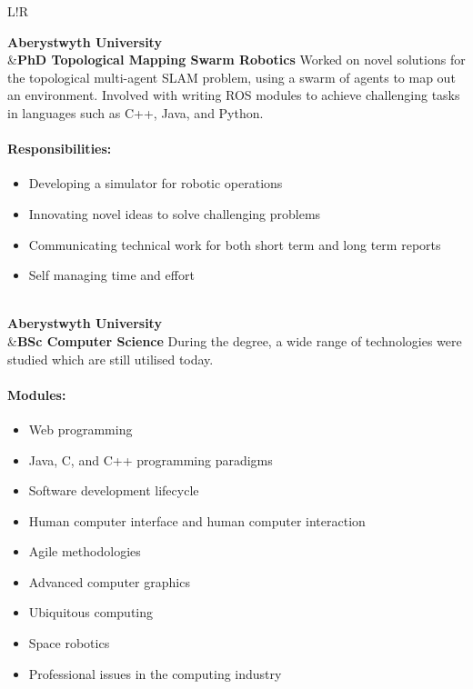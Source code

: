 \documentclass[10pt]{article}
\newcommand\VRule{\color{lightgray}\vrule width 0.5pt}
\begin{document}
\begin{longtable}{L!{\VRule}R}

{\bf Aberystwyth University}\\
&{\bf PhD Topological Mapping Swarm Robotics}\newline
Worked on novel solutions for the topological multi-agent SLAM problem, using a swarm of agents to map out an environment. Involved with writing ROS modules to achieve challenging tasks in languages such as C++, Java, and Python.

\vspace{-3mm}
\paragraph{Responsibilities:}
\begin{itemize}[noitemsep,topsep=0pt]
	\item Developing a simulator for robotic operations
	\item Innovating novel ideas to solve challenging problems
	\item Communicating technical work for both short term and long term reports
	\item Self managing time and effort
\end{itemize}
\\

{\bf Aberystwyth University}\\
&{\bf BSc Computer Science}\newline
During the degree, a wide range of technologies were studied which are still utilised today.

\vspace{-3mm}
\paragraph{Modules:}
\begin{itemize}[noitemsep,topsep=0pt]
    \item Web programming
    \item Java, C, and C++ programming paradigms
    \item Software development lifecycle
    \item Human computer interface and human computer interaction
    \item Agile methodologies
    \item Advanced computer graphics
    \item Ubiquitous computing
    \item Space robotics
    \item Professional issues in the computing industry
\end{itemize}
\\

\end{longtable}
\end{document}
